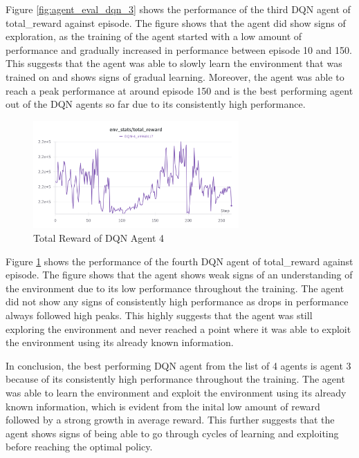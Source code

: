 Figure \ref{fig:agent_eval_dqn_3} shows the performance of the third DQN agent of total\_reward against episode. The figure shows that the agent did show signs of exploration, as the training of the agent started with a low amount of performance and gradually increased in performance between episode 10 and 150. This suggests that the agent was able to slowly learn the environment that was trained on and shows signs of gradual learning. Moreover, the agent was able to reach a peak performance at around episode 150 and is the best performing agent out of the DQN agents so far due to its consistently high performance. 

\begin{figure}[H]
    \centering
    \includegraphics[width=0.7\textwidth]{figures/DQN-4_TotalReward.png}
    \caption{Total Reward of DQN Agent 4}
    \label{fig:agent_eval_dqn_4}
\end{figure}

Figure \ref{fig:agent_eval_dqn_4} shows the performance of the fourth DQN agent of total\_reward against episode. The figure shows that the agent shows weak signs of an understanding of the environment due to its low performance throughout the training. The agent did not show any signs of consistently high performance as drops in performance always followed high peaks. This highly suggests that the agent was still exploring the environment and never reached a point where it was able to exploit the environment using its already known information.

In conclusion, the best performing DQN agent from the list of 4 agents is agent 3 because of its consistently high performance throughout the training. The agent was able to learn the environment and exploit the environment using its already known information, which is evident from the inital low amount of reward followed by a strong growth in average reward. This further suggests that the agent shows signs of being able to go through cycles of learning and exploiting before reaching the optimal policy. 

